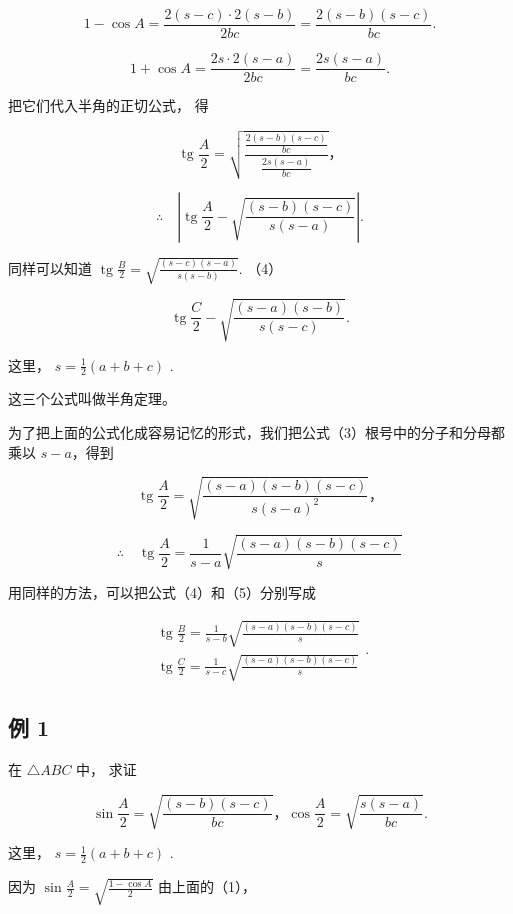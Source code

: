 \[
1 - \cos A = \frac {2 (s - c) \cdot 2 (s - b)}{2 b c} = \frac {2 (s - b) (s - c)}{b c}. \tag {1}
\]

\[
1 + \cos A = \frac {2 s \cdot 2 (s - a)}{2 b c} = \frac {2 s (s - a)}{b c}. \tag {2}
\]

把它们代入半角的正切公式， 得

\[
\operatorname{tg} \frac {A}{2} = \sqrt {\frac {\frac {2 (s - b) (s - c)}{b c}}{\frac {2 s (s - a)}{b c}}}\text{，}
\]

\[
\therefore \quad \left| \operatorname{tg} \frac {A}{2} - \sqrt {\frac {(s - b) (s - c)}{s (s - a)}} \right|. \tag {3}
\]

同样可以知道
\(\operatorname{tg}\frac{B}{2}=\sqrt{\frac{(s-c)(s-a)}{s(s-b)}}.\) （4）

\[
\operatorname{tg} \frac {C}{2} - \sqrt {\frac {(s - a) (s - b)}{s (s - c)}}. \tag {5}
\]

这里， \(s=\frac{1}{2}(a+b+c)\) .

这三个公式叫做半角定理。

为了把上面的公式化成容易记忆的形式，我们把公式（3）根号中的分子和分母都乘以
\(s - a\)，得到

\[
\operatorname{tg} \frac {A}{2} = \sqrt {\frac {(s - a) (s - b) (s - c)}{s (s - a) ^ {2}}}\text{，}
\]

\[
\therefore \quad \operatorname{tg} \frac {A}{2} = \frac {1}{s - a} \sqrt {\frac {(s - a) (s - b) (s - c)}{s}}
\]

用同样的方法，可以把公式（4）和（5）分别写成

\[
\boxed { \begin{array}{l} \operatorname{tg} \frac {B}{2} = \frac {1}{s - b} \sqrt {\frac {(s - a) (s - b) (s - c)}{s}} \\ \operatorname{tg} \frac {C}{2} = \frac {1}{s - c} \sqrt {\frac {(s - a) (s - b) (s - c)}{s}} \end{array} }.
\]

\subsection{例 1}

在 \(\triangle ABC\) 中， 求证

\[
\sin \frac {A}{2} = \sqrt {\frac {(s - b) (s - c)}{b c}}\text{，} \cos \frac {A}{2} = \sqrt {\frac {s (s - a)}{b c}}.
\]

这里， \(s=\frac{1}{2}(a+b+c)\) .

 因为 \(\sin \frac{A}{2} = \sqrt{\frac{1 - \cos A}{2}}\)
由上面的（1），

